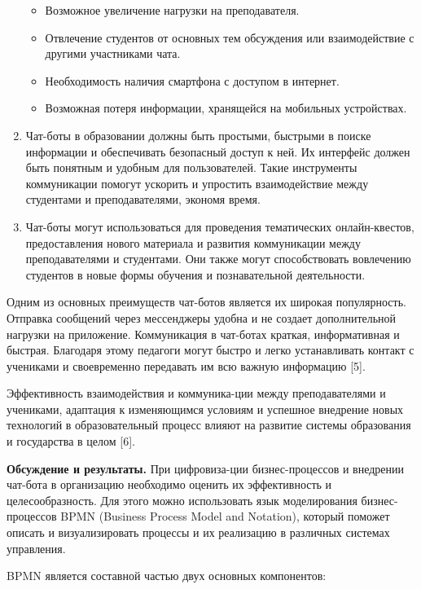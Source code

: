 \begin{multicols}{2}
\begin{enumerate}
  \begin{itemize}
    \setlength{\itemindent}{1cm}
  \item
    Возможное увеличение нагрузки на преподавателя.
  \item
    Отвлечение студентов от основных тем обсуждения или взаимодействие с
    другими участниками чата.
  \item
    Необходимость наличия смартфона с доступом в интернет.
  \item
    Возможная потеря информации, хранящейся на мобильных устройствах.
  \end{itemize}
\item
  Чат-боты в образовании должны быть простыми, быстрыми в поиске
  информации и обеспечивать безопасный доступ к ней. Их интерфейс должен
  быть понятным и удобным для пользователей. Такие инструменты
  коммуникации помогут ускорить и упростить взаимодействие между
  студентами и преподавателями, экономя время.
\item
  Чат-боты могут использоваться для проведения тематических
  онлайн-квестов, предоставления нового материала и развития
  коммуникации между преподавателями и студентами. Они также могут
  способствовать вовлечению студентов в новые формы обучения и
  познавательной деятельности.
\end{enumerate}

Одним из основных преимуществ чат-ботов является их широкая
популярность. Отправка сообщений через мессенджеры удобна и не создает
дополнительной нагрузки на приложение. Коммуникация в чат-ботах краткая,
информативная и быстрая. Благодаря этому педагоги могут быстро и легко
устанавливать контакт с учениками и своевременно передавать им всю
важную информацию {[}5{]}.

Эффективность взаимодействия и коммуника-ции между преподавателями и
учениками, адаптация к изменяющимся условиям и успешное внедрение новых
технологий в образовательный процесс влияют на развитие системы
образования и государства в целом {[}6{]}.

{\bfseries Обсуждение и результаты.} При цифровиза-ции бизнес-процессов и
внедрении чат-бота в организацию необходимо оценить их эффективность и
целесообразность. Для этого можно использовать язык моделирования
бизнес-процессов BPMN (Business Process Model and Notation), который
поможет описать и визуализировать процессы и их реализацию в различных
системах управления.

BPMN является составной частью двух основных компонентов:


\end{multicols}
